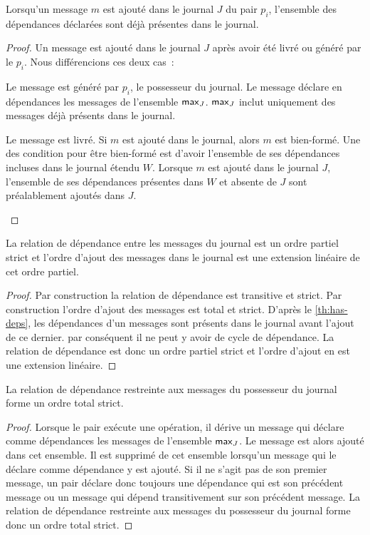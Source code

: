 \begin{lemma}\label{th:has-deps}
Lorsqu'un message $m$ est ajouté dans le journal $J$ du pair $p_i$, l'ensemble des dépendances déclarées sont déjà présentes dans le journal.
\end{lemma}
\begin{proof}
Un message est ajouté dans le journal $J$ après avoir été livré ou généré par le $p_i$.
Nous différencions ces deux cas~:
    \begin{case}[$\trm{peer}_m = p_i$]
    Le message est généré par $p_i$, le possesseur du journal.
    Le message déclare en dépendances les messages de l'ensemble $\operatorname{\mathsf{max}}_J$.
    $\operatorname{\mathsf{max}}_J$ inclut uniquement des messages déjà présents dans le journal.
    \end{case}
    \begin{case}
    Le message est livré.
    Si $m$ est ajouté dans le journal, alors $m$ est bien-formé.
    Une des condition pour être bien-formé est d'avoir l'ensemble de ses dépendances incluses dans le journal étendu $W$.
    Lorsque $m$ est ajouté dans le journal $J$, l'ensemble de ses dépendances présentes dans $W$ et absente de $J$ sont préalablement ajoutés dans $J$.
    \end{case}
\end{proof}

\begin{lemma}
La relation de dépendance entre les messages du journal est un ordre partiel strict et l'ordre d'ajout des messages dans le journal est une extension linéaire de cet ordre partiel.
\end{lemma}
\begin{proof}
Par construction la relation de dépendance est transitive et strict.
Par construction l'ordre d'ajout des messages est total et strict.
D'après le \autoref{th:has-deps}, les dépendances d'un messages sont présents dans le journal avant l'ajout de ce dernier.
par conséquent il ne peut y avoir de cycle de dépendance.
La relation de dépendance est donc un ordre partiel strict et l'ordre d'ajout en est une extension linéaire.
\end{proof}

\begin{lemma}\label{th:total-dep-owner}
La relation de dépendance restreinte aux messages du possesseur du journal forme un ordre total strict.
\end{lemma}
\begin{proof}
Lorsque le pair exécute une opération, il dérive un message qui déclare comme dépendances les messages de l'ensemble $\operatorname{\mathsf{max}}_J$.
Le message est alors ajouté dans cet ensemble.
Il est supprimé de cet ensemble lorsqu'un message qui le déclare comme dépendance y est ajouté.
Si il ne s'agit pas de son premier message, un pair déclare donc toujours une dépendance qui est son précédent message ou un message qui dépend transitivement sur son précédent message.
La relation de dépendance restreinte aux messages du possesseur du journal forme donc un ordre total strict.
\end{proof}

